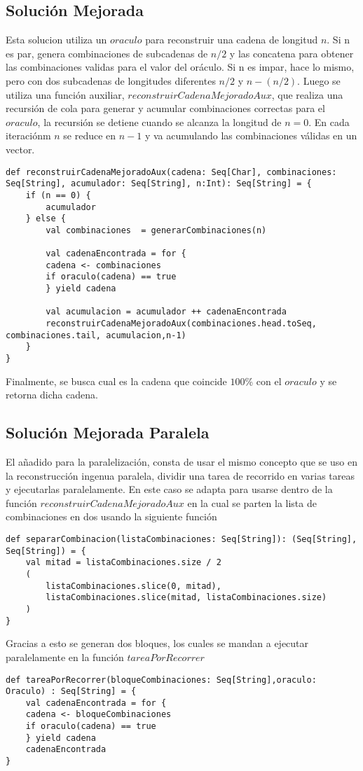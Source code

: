 \documentclass[conference]{IEEEtran}
\begin{document}
\subsection{\textbf{Solución Mejorada}}
Esta solucion utiliza un $oraculo$ para reconstruir una cadena de longitud $n$. Si n es par, genera combinaciones de subcadenas de $n/2$ y las concatena para obtener las combinaciones validas para el valor del oráculo. Si n es impar, hace lo mismo, pero con dos subcadenas de longitudes diferentes $n/2$  y $n-(n/2)$. Luego se utiliza una función auxiliar, $reconstruirCadenaMejoradoAux$, que realiza una recursión de cola para generar y acumular combinaciones correctas para el $oraculo$, la recursión se detiene cuando se alcanza  la longitud de $n=0$. En cada iteraciónm $n$ se reduce en $n-1$ y va acumulando las combinaciones válidas en un vector. 

\newpage
\begin{lstlisting}
def reconstruirCadenaMejoradoAux(cadena: Seq[Char], combinaciones: Seq[String], acumulador: Seq[String], n:Int): Seq[String] = {
    if (n == 0) {
        acumulador
    } else {
        val combinaciones  = generarCombinaciones(n)
                
        val cadenaEncontrada = for {
        cadena <- combinaciones
        if oraculo(cadena) == true
        } yield cadena
            
        val acumulacion = acumulador ++ cadenaEncontrada
        reconstruirCadenaMejoradoAux(combinaciones.head.toSeq, combinaciones.tail, acumulacion,n-1)
    }
}

\end{lstlisting}


Finalmente, se busca cual es la cadena que coincide $100$\% con el $oraculo$ y se retorna dicha cadena.


\subsection{\textbf{Solución Mejorada Paralela}}

El añadido para la paralelización, consta de usar el mismo concepto que se uso en la reconstrucción ingenua paralela, dividir una tarea de recorrido en varias tareas y ejecutarlas paralelamente. En este caso se adapta para usarse dentro de la función $reconstruirCadenaMejoradoAux$ en la cual se parten la lista de combinaciones en dos usando la siguiente función
\begin{lstlisting}
def separarCombinacion(listaCombinaciones: Seq[String]): (Seq[String],  Seq[String]) = {
    val mitad = listaCombinaciones.size / 2
    (
        listaCombinaciones.slice(0, mitad),
        listaCombinaciones.slice(mitad, listaCombinaciones.size)
    )
}
\end{lstlisting}
Gracias a esto se generan dos bloques, los cuales se mandan a ejecutar paralelamente en la función $tareaPorRecorrer$
\begin{lstlisting}
def tareaPorRecorrer(bloqueCombinaciones: Seq[String],oraculo: Oraculo) : Seq[String] = {
    val cadenaEncontrada = for {
    cadena <- bloqueCombinaciones
    if oraculo(cadena) == true
    } yield cadena
    cadenaEncontrada
}
\end{lstlisting}
\end{document}
